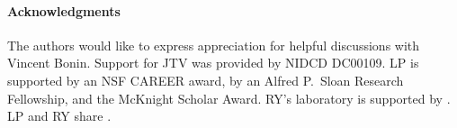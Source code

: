 \paragraph{Acknowledgments}

The authors would like to express appreciation for helpful discussions with Vincent Bonin.  Support for JTV was provided by NIDCD DC00109. LP is supported by an NSF CAREER award, by an Alfred P.\ Sloan Research Fellowship, and the McKnight Scholar Award. RY's laboratory is supported by .  LP and RY share .


%
%

%


\appendix



